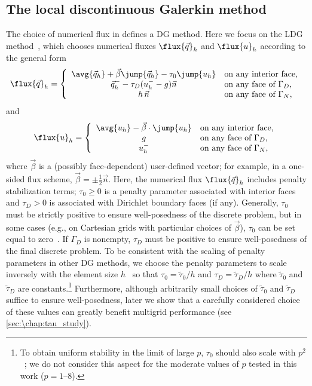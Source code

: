 \subsection{The local discontinuous Galerkin method}\label{sec:\chap:LDG}
The choice of numerical flux in  defines a DG method. Here we focus on the LDG method~\cite{Cockburn_98_01}, which chooses numerical fluxes $\flux{\vec{q}}_h$ and $\flux{u}_h$ according to the general form
\begin{equation}\label{eq:\chap:q_flux}
\flux{\vec{q}}_h = \left\{
\begin{array}{cl}
\avg{\vec{q}_h} + \vec{\beta} \jump{\vec{q}_h} - \tau_0\jump{u_h} & \text{on any interior face,} \\
\vec{q}_h^- -\tau_D (u_h^- - g) \vec{n} & \text{on any face of $\Gamma_D$,} \\
h\,\vec{n} & \text{on any face of $\Gamma_N$},
\end{array}
\right.
\end{equation}
and
\begin{equation}\label{eq:\chap:u_flux}
\flux{u}_h = \left\{
\begin{array}{cl}
\avg{u_h} - \vec{\beta}\cdot\jump{u_h} & \text{on any interior face,} \\
g & \text{on any face of $\Gamma_D$,} \\
u_h^- & \text{on any face of $\Gamma_N$},
\end{array}
\right.
\end{equation}
where $\vec{\beta}$ is a (possibly face-dependent) user-defined vector; for example, in a one-sided flux scheme, $\vec{\beta} = \pm \tfrac12 \vec{n}$. Here, the numerical flux $\flux{\vec{q}}_h$ includes penalty stabilization terms; $\tau_0 \geq 0$ is a penalty parameter associated with interior faces and $\tau_D > 0$ is associated with Dirichlet boundary faces (if any). Generally, $\tau_0$ must be strictly positive to ensure well-posedness of the discrete problem, but in some cases (e.g., on Cartesian grids with particular choices of $\vec{\beta}$), $\tau_0$ can be set equal to zero~\cite{Cockburn_07_01}. If $\Gamma_D$ is nonempty, $\tau_D$ must be positive to ensure well-posedness of the final discrete problem. To be consistent with the scaling of penalty parameters in other DG methods, we choose the penalty parameters to scale inversely with the element size $h$~\cite{Castillo_00_01} so that $\tau_0 = \widetilde{\tau}_0/h$ and $\tau_D = \widetilde{\tau}_D/h$ where $\widetilde{\tau}_0$ and $\widetilde{\tau}_D$ are constants.\footnote{To obtain uniform stability in the limit of large $p$, $\tau_0$ should also scale with $p^2$~\cite{Perugia_02_01}; we do not consider this aspect for the moderate values of $p$ tested in this work ($p=1\mbox{--}8$).} Furthermore, although arbitrarily small choices of $\widetilde{\tau}_0$ and $\widetilde{\tau}_D$ suffice to ensure well-posedness, later we show that a carefully considered choice of these values can greatly benefit multigrid performance (see \cref{sec:\chap:tau_study}).


